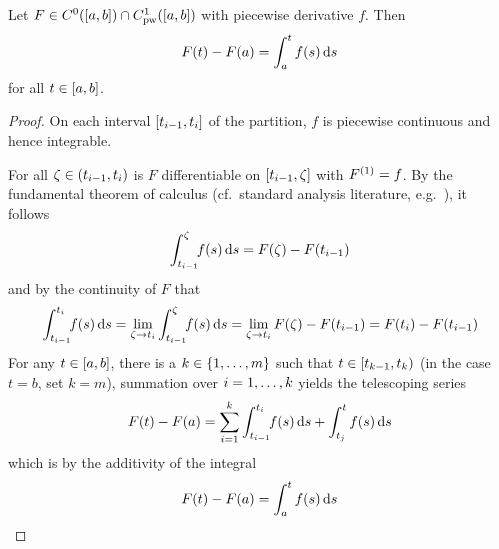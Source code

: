     \begin{lemma}\label{lm:pc-hauptsatz}
        Let $F\in\Cn[0]{\compactum{a}{b}}{} \cap \Cnpw[1]{\compactum{a}{b}}{}$
        with piecewise derivative $f$. Then
        \begin{equation*}
            F(t)-F(a) = \integral{a}{t} f(s)\dx[s]
        \end{equation*}
        for all $t\in\compactum{a}{b}$.
    \end{lemma}
    \begin{proof}
        On each interval $\compactum{t_{i-1}}{t_i}$ of the partition, $f$ is piecewise continuous and hence integrable.

        For all $\zeta\in\open{t_{i-1}}{t_i}$ is $F$ differentiable on $\compactum{t_{i-1}}{\zeta}$ with $\D{F}=f$.
        By the fundamental theorem of calculus (cf.\ standard analysis literature, e.g.~\cite{Gathmann12GDM,Rudin76PrinciplesAnalysis}), it follows
        \begin{equation*}
            \denseintegral{t_{i-1}}{\zeta} f(s)\dx[s] = F(\zeta)-F(t_{i-1})
        \end{equation*}
        and by the continuity of $F$ that
        \begin{equation*}
            \denseintegral{t_{i-1}}{t_i} f(s)\dx[s]
            = \lim_{\zeta\to t_i}\denseintegral{t_{i-1}}{\zeta} f(s)\dx[s]
            = \lim_{\zeta\to t_i} F(\zeta)-F(t_{i-1})
            = F(t_i)-F(t_{i-1})
        \end{equation*}
        For any $t\in\compactum{a}{b}$, there is a $k\in\set{\range{1}{m}}$ such that $t\in\closedopen{t_{k-1}}{t_k}$ (in the case $t=b$, set $k=m$), summation over $i=\range{1}{k}$ yields the telescoping series
        \begin{equation*}
            F(t)-F(a) = \sum_{i=1}^{k} \denseintegral{t_{i-1}}{t_i} f(s)\dx[s] + \integral{t_j}{t} f(s)\dx[s]
        \end{equation*}
        which is by the additivity of the integral
        \begin{equation*}
            F(t)-F(a) = \integral{a}{t} f(s)\dx[s]
        \end{equation*}
    \end{proof}

